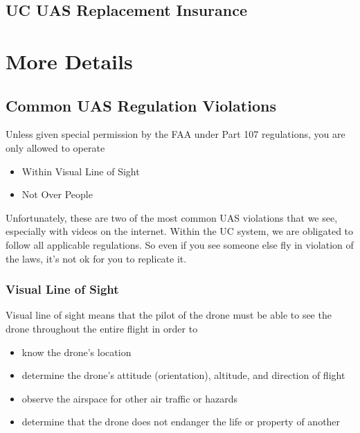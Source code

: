 \documentclass[
]{book}
\providecommand{\tightlist}{%
  \setlength{\itemsep}{0pt}\setlength{\parskip}{0pt}}
\begin{document}
\hypertarget{ch-hull-insurance}{%
\chapter{UC UAS Replacement Insurance}\label{ch-hull-insurance}}

\hypertarget{part-more-details}{%
\part{More Details}\label{part-more-details}}

\hypertarget{ch-common-UAS-violations}{%
\chapter{Common UAS Regulation Violations}\label{ch-common-UAS-violations}}

Unless given special permission by the FAA under Part 107 regulations, you are only allowed to operate

\begin{itemize}
\tightlist
\item
  Within Visual Line of Sight
\item
  Not Over People
\end{itemize}

Unfortunately, these are two of the most common UAS violations that we see, especially with videos on the internet. Within the UC system, we are obligated to follow all applicable regulations. So even if you see someone else fly in violation of the laws, it's not ok for you to replicate it.

\hypertarget{visual-line-of-sight}{%
\section{Visual Line of Sight}\label{visual-line-of-sight}}

Visual line of sight means that the pilot of the drone must be able to see the drone throughout the entire flight in order to

\begin{itemize}
\tightlist
\item
  know the drone's location
\item
  determine the drone's attitude (orientation), altitude, and direction of flight
\item
  observe the airspace for other air traffic or hazards
\item
  determine that the drone does not endanger the life or property of another
\end{itemize}
\end{document}
